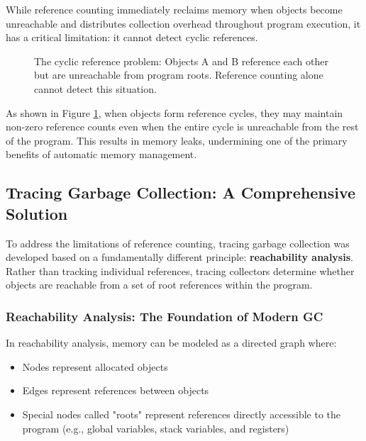 While reference counting immediately reclaims memory when objects become unreachable and distributes collection overhead throughout program execution, it has a critical limitation: it cannot detect cyclic references.

\begin{figure}[h]
\centering
{}
\caption{The cyclic reference problem: Objects A and B reference each other but are unreachable from program roots. Reference counting alone cannot detect this situation.}
\label{fig:cyclic_refs}
\end{figure}

As shown in Figure \ref{fig:cyclic_refs}, when objects form reference cycles, they may maintain non-zero reference counts even when the entire cycle is unreachable from the rest of the program. This results in memory leaks, undermining one of the primary benefits of automatic memory management.

\subsection{Tracing Garbage Collection: A Comprehensive Solution}

To address the limitations of reference counting, tracing garbage collection was developed based on a fundamentally different principle: \textbf{reachability analysis}. Rather than tracking individual references, tracing collectors determine whether objects are reachable from a set of root references within the program.

\subsubsection{Reachability Analysis: The Foundation of Modern GC}

In reachability analysis, memory can be modeled as a directed graph where:
\begin{itemize}
    \item Nodes represent allocated objects
    \item Edges represent references between objects
    \item Special nodes called "roots" represent references directly accessible to the program (e.g., global variables, stack variables, and registers)
\end{itemize}

